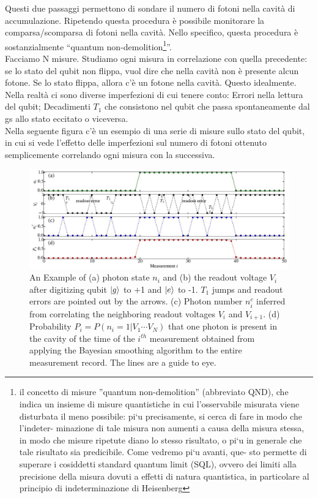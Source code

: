 \documentclass[10pt,a4paper]{article}
\begin{document}
Questi due passaggi permettono di sondare il numero di fotoni nella cavità di accumulazione. Ripetendo questa procedura è possibile monitorare la comparsa/scomparsa di fotoni nella cavità. Nello specifico, questa procedura è sostanzialmente “quantum non-demolition\footnote{il concetto di misure ”quantum
non-demolition” (abbreviato QND), che indica un insieme di misure quantistiche in cui l’osservabile
misurata viene disturbata il meno possibile: pi`u precisamente, si cerca di fare in modo che l’indeter-
minazione di tale misura non aumenti a causa della misura stessa, in modo che misure ripetute diano
lo stesso risultato, o pi`u in generale che tale risultato sia predicibile. Come vedremo pi`u avanti, que-
sto permette di superare i cosiddetti standard quantum limit (SQL), ovvero dei limiti alla precisione
della misura dovuti a effetti di natura quantistica, in particolare al principio di indeterminazione di
Heisenberg}”.\\

Facciamo N misure. Studiamo ogni misura in correlazione con quella precedente: se lo stato del qubit non flippa, vuol dire che nella cavità non è presente alcun fotone. Se lo stato flippa, allora c’è un fotone nella cavità. Questo idealmente.\\

Nella realtà ci sono diverse imperfezioni di cui tenere conto: Errori nella lettura del qubit; Decadimenti $T_1$ che consistono nel qubit che passa spontaneamente dal gs allo stato eccitato o viceversa.\\

Nella seguente figura c’è un esempio di una serie di misure sullo stato del qubit, in cui si vede l’effetto delle imperfezioni sul numero di fotoni ottenuto semplicemente correlando ogni misura con la successiva.


\begin{figure}[h]
    \centering
    \includegraphics[width=1\textwidth]{measures.JPG}
    \caption{An Example of (a) photon state $n_i$ and (b) the readout voltage $V_i$ after digitizing qubit $\ket{g}$ to +1 and $\ket{e}$ to -1. $T_1$ jumps and readout errors are pointed out by the arrows. (c) Photon number $n_i^c$ inferred from correlating the neighboring readout voltages $V_i$ and $V_{i+1}$. (d) Probability $P_i = P(n_i = 1|V_1\cdots V_N)$ that one photon is present in the cavity of the time of the $i^{th}$ measurement obtained from applying the Bayesian smoothing algorithm to the entire measurement record. The lines are a guide to eye.}
    \label{meas}
\end{figure}
\FloatBarrier
\end{document}
